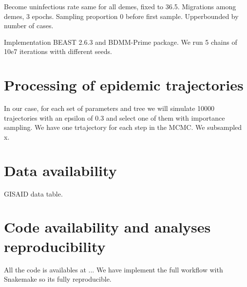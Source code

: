 Become uninfectious rate same for all demes, fixed to 36.5.
Migrations among demes, 3 epochs.
Sampling proportion 0 before first sample. Upperbounded by number of cases.

Implementation BEAST 2.6.3 and BDMM-Prime package.
We run 5 chains of 10e7 iterations witth different seeds.

\section{Processing of epidemic trajectories}
In our case, for each set of parameters and tree we will simulate 10000 trajectories with an epsilon of 0.3 and select one of them with importance sampling.
We have one trtajectory for each step in the MCMC. We subsampled x. 

\section{Data availability}
GISAID data table.

\section{Code availability and analyses reproducibility}
All the code is availables at ...
We have implement the full workflow with Snakemake so its fully reproducible.


